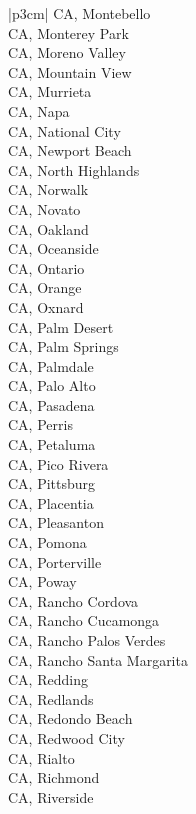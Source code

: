 \begin{customLongTable}{ |p{3cm}| }
CA, Montebello \\ \hline
CA, Monterey Park \\ \hline
CA, Moreno Valley \\ \hline
CA, Mountain View \\ \hline
CA, Murrieta \\ \hline
CA, Napa \\ \hline
CA, National City \\ \hline
CA, Newport Beach \\ \hline
CA, North Highlands \\ \hline
CA, Norwalk \\ \hline
CA, Novato \\ \hline
CA, Oakland \\ \hline
CA, Oceanside \\ \hline
CA, Ontario \\ \hline
CA, Orange \\ \hline
CA, Oxnard \\ \hline
CA, Palm Desert \\ \hline
CA, Palm Springs \\ \hline
CA, Palmdale \\ \hline
CA, Palo Alto \\ \hline
CA, Pasadena \\ \hline
CA, Perris \\ \hline
CA, Petaluma \\ \hline
CA, Pico Rivera \\ \hline
CA, Pittsburg \\ \hline
CA, Placentia \\ \hline
CA, Pleasanton \\ \hline
CA, Pomona \\ \hline
CA, Porterville \\ \hline
CA, Poway \\ \hline
CA, Rancho Cordova \\ \hline
CA, Rancho Cucamonga \\ \hline
CA, Rancho Palos Verdes \\ \hline
CA, Rancho Santa Margarita \\ \hline
CA, Redding \\ \hline
CA, Redlands \\ \hline
CA, Redondo Beach \\ \hline
CA, Redwood City \\ \hline
CA, Rialto \\ \hline
CA, Richmond \\ \hline
CA, Riverside \\ \hline

\end{customLongTable}
